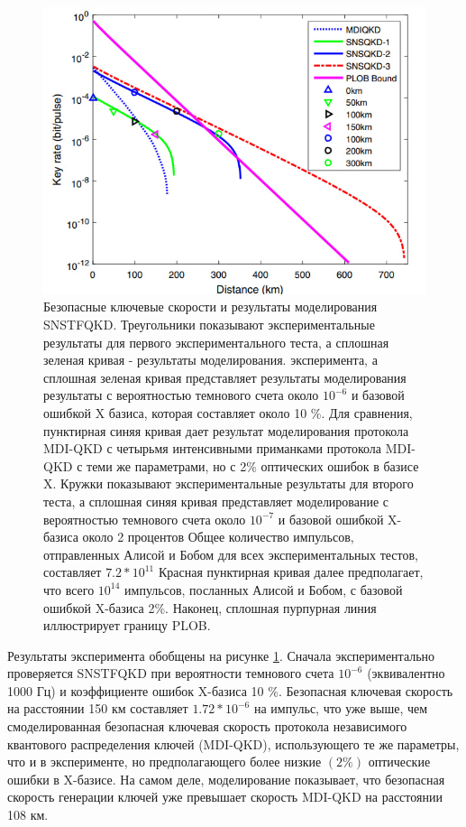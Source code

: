  \begin{figure}
     \centering
     \includegraphics{images/TF key rate lit.jpg}
     \caption{Безопасные ключевые скорости и результаты моделирования SNSTFQKD.
Треугольники показывают экспериментальные результаты для первого экспериментального теста, а сплошная зеленая кривая - результаты моделирования. эксперимента, а сплошная зеленая кривая представляет результаты моделирования
результаты с вероятностью темнового счета около $10^{-6}$ и базовой ошибкой X базиса,  которая составляет около 10 \%. Для сравнения, пунктирная синяя кривая дает результат моделирования протокола MDI-QKD с четырьмя интенсивными приманками протокола MDI-QKD с теми же параметрами, но с
2\% оптических ошибок в базисе X. Кружки показывают экспериментальные результаты для второго теста, а сплошная синяя кривая представляет моделирование с вероятностью темнового счета около
$10^{-7}$ и базовой ошибкой X-базиса около 2 процентов  Общее количество
импульсов, отправленных Алисой и Бобом для всех экспериментальных тестов, составляет
$7.2*10^{11}$ Красная пунктирная кривая далее предполагает, что всего $10^{14}$ импульсов, посланных Алисой и Бобом, с базовой ошибкой X-базиса 2\%. Наконец, сплошная пурпурная линия иллюстрирует границу PLOB.}
     \label{fig:TF key rate lit}
 \end{figure}
 Результаты эксперимента обобщены на рисунке \ref{fig:TF key rate lit}. Сначала экспериментально проверяется SNSTFQKD при вероятности темнового счета $10^{-6}$ (эквивалентно 1000 Гц) и коэффициенте ошибок X-базиса 10 \%. Безопасная ключевая скорость на расстоянии 150 км составляет $1.72*10^{-6}$  на импульс, что уже выше, чем смоделированная безопасная ключевая скорость протокола независимого квантового распределения ключей (MDI-QKD), использующего те же параметры, что и в эксперименте, но предполагающего более низкие $(2\%)$ оптические ошибки в X-базисе. На самом деле, моделирование показывает, что безопасная скорость генерации ключей уже превышает скорость MDI-QKD на расстоянии 108 км.
